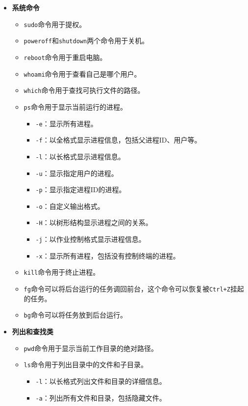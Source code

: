 \documentclass[../main.tex]{subfiles}
\begin{document}
\begin{itemize}
  \item \textbf{系统命令}
  \begin{itemize}
    \item \texttt{sudo}命令用于提权。
    \item \texttt{poweroff}和\texttt{shutdown}两个命令用于关机。
    \item \texttt{reboot}命令用于重启电脑。
    \item \texttt{whoami}命令用于查看自己是哪个用户。
    \item \texttt{which}命令用于查找可执行文件的路径。
    \item \texttt{ps}命令用于显示当前运行的进程。
    \begin{itemize}
      \item \texttt{-e}：显示所有进程。
      \item \texttt{-f}：以全格式显示进程信息，包括父进程ID、用户等。
      \item \texttt{-l}：以长格式显示进程信息。
      \item \texttt{-u}：显示指定用户的进程。
      \item \texttt{-p}：显示指定进程ID的进程。
      \item \texttt{-o}：自定义输出格式。
      \item \texttt{-H}：以树形结构显示进程之间的关系。
      \item \texttt{-j}：以作业控制格式显示进程信息。
      \item \texttt{-x}：显示所有进程，包括没有控制终端的进程。
    \end{itemize}
    \item \texttt{kill}命令用于终止进程。
    \item \texttt{fg}命令可以将后台运行的任务调回前台，这个命令可以恢复被\texttt{Ctrl+Z}挂起的任务。
    \item \texttt{bg}命令可以将任务放到后台运行。
  \end{itemize}
  \item \textbf{列出和查找类}
  \begin{itemize}
    \item \texttt{pwd}命令用于显示当前工作目录的绝对路径。
    \item \texttt{ls}命令用于列出目录中的文件和子目录。
    \begin{itemize}
      \item \texttt{-l}：以长格式列出文件和目录的详细信息。
      \item \texttt{-a}：列出所有文件和目录，包括隐藏文件。

\end{itemize}
\end{itemize}
\end{itemize}
\end{document}

